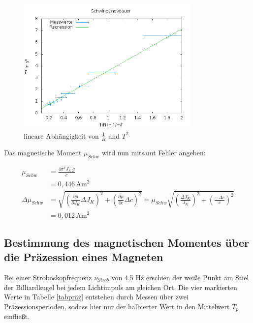 \begin{figure}[H]
\includegraphics[width=0.8\textwidth] {pics/Schwingung.png}
\centering
\caption{lineare Abhängigkeit von $\frac{1}{B}$ und $T^2$}
\label{picschwing}
\end{figure}

Das magnetische Moment $\mu_{Schw}$ wird nun mitsamt Fehler angeben:

\begin{align}
 \nonumber
 \mu_{Schw} &= \frac{4 \pi^2 J_{K}\,g}{c} \\
 &= 0,446\, \text{Am}^2\\
 \nonumber
 \Delta \mu_{Schw} &= \sqrt{\left(\frac{\partial \mu}{\partial J_{K}}\Delta J_{K} \right)^2 + \left(\frac{\partial \mu}{\partial c}\Delta c \right)^2} = \mu_{Schw} \sqrt{\left( \frac{\Delta J_{K}}{J_{K}}\right)^2 + \left( \frac{-\Delta c}{c}\right)^2}\\
 &= 0,012 \, \text{Am}^2
\end{align}

\subsection[Ermittlung durch Präzission]{Bestimmung des magnetischen Momentes über die Präzession eines Magneten}
Bei einer Stroboskopfrequenz $\nu_{Strob}$ von 4,5 Hz erschien der weiße Punkt am Stiel der Billiardkugel bei jedem Lichtimpuls
am gleichen Ort. Die vier markierten Werte in Tabelle \ref{tabpräz} entstehen durch Messen über zwei Präzessionsperioden, sodass hier nur
der halbierter Wert in den Mittelwert $\bar T_{p}$ einfließt.


